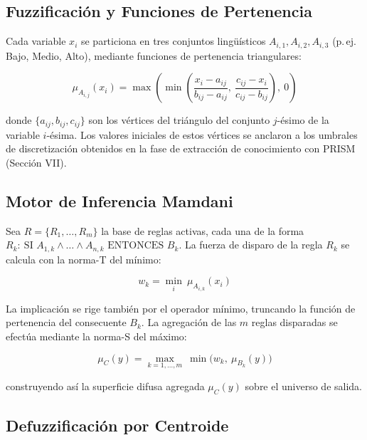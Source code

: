 \documentclass[12pt,a4paper]{article}
\begin{document}
\subsection{Fuzzificación y Funciones de Pertenencia}

Cada variable $x_i$ se particiona en tres conjuntos lingüísticos
$A_{i,1}, A_{i,2}, A_{i,3}$ (p.\,ej. Bajo, Medio, Alto), mediante
funciones de pertenencia triangulares:

\begin{equation}
\mu_{A_{i,j}}(x_i) = \max\left( \min\left( \frac{x_i - a_{ij}}{b_{ij} - a_{ij}},
\ \frac{c_{ij} - x_i}{c_{ij} - b_{ij}} \right),\ 0 \right)
\end{equation}

donde $\{a_{ij}, b_{ij}, c_{ij}\}$ son los vértices del triángulo del
conjunto $j$-ésimo de la variable $i$-ésima. Los valores iniciales de
estos vértices se anclaron a los umbrales de discretización obtenidos en
la fase de extracción de conocimiento con PRISM (Sección VII).

\subsection{Motor de Inferencia Mamdani}

Sea $R = \{R_1, \dots, R_m\}$ la base de reglas activas, cada una de la
forma $R_k:\ \text{SI } A_{1,k} \wedge \dots \wedge A_{n,k} \text{ ENTONCES } B_k$.
La fuerza de disparo de la regla $R_k$ se calcula con la norma-T del
mínimo:

\begin{equation}
w_k = \min_i\ \mu_{A_{i,k}}(x_i)
\end{equation}

La implicación se rige también por el operador mínimo, truncando la
función de pertenencia del consecuente $B_k$. La agregación de las $m$
reglas disparadas se efectúa mediante la norma-S del máximo:

\begin{equation}
\mu_C(y) = \max_{k=1,\dots,m}\ \min\big(w_k,\ \mu_{B_k}(y)\big)
\end{equation}

construyendo así la superficie difusa agregada $\mu_C(y)$ sobre el
universo de salida.

\subsection{Defuzzificación por Centroide}
\end{document}
